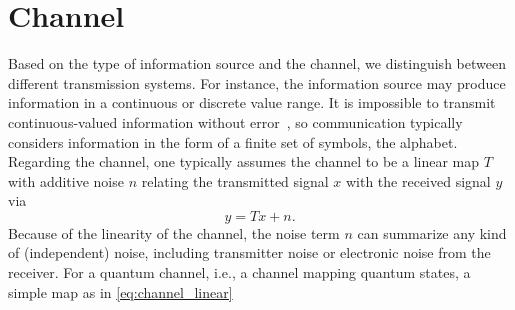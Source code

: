 \section{Channel}

Based on the type of information source and the channel, we distinguish between different transmission systems.
For instance, the information source may produce information in a continuous or discrete value range.
It is impossible to transmit continuous-valued information without error~\cite[p.~47]{Shannon1948}, so communication typically considers information in the form of a finite set of symbols, the alphabet.
Regarding the channel, one typically assumes the channel to be a linear map $T$ with additive noise $n$ relating the transmitted signal $x$ with the received signal $y$ via
\begin{equation}
	y
	=
	Tx
	+
	n
	\label{eq:classic_channel}
	.
\end{equation}
Because of the linearity of the channel, the noise term $n$ can summarize any kind of (independent) noise, including transmitter noise or electronic noise from the receiver.
For a quantum channel, i.e., a channel mapping quantum states, a simple map as in \cref{eq:channel_linear}


